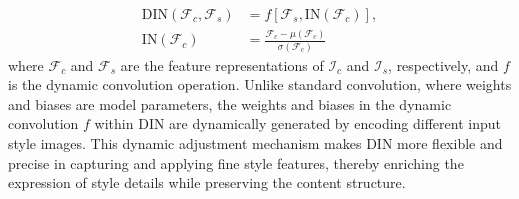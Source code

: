 \documentclass[preprint,12pt]{elsarticle}
\begin{document}
\begin{equation}
    \begin{aligned}
        \text{DIN}(\mathcal{F}_c,\mathcal{F}_s) &= f[\mathcal{F}_s,\text{IN}(\mathcal{F}_c)],\\
        \text{IN}(\mathcal{F}_c) &= \frac{\mathcal{F}_c-\mu(\mathcal{F}_c)}{\sigma(\mathcal{F}_c)}
    \end{aligned}
\end{equation}
where $\mathcal{F}_c$ and $\mathcal{F}_s$ are the feature representations of $\mathcal{I}_c$ and $\mathcal{I}_s$, respectively, and $f$ is the dynamic convolution operation\citep{42jia2016dynamic}. Unlike standard convolution, where weights and biases are model parameters, the weights and biases in the dynamic convolution $f$ within DIN are dynamically generated by encoding different input style images. This dynamic adjustment mechanism makes DIN more flexible and precise in capturing and applying fine style features, thereby enriching the expression of style details while preserving the content structure.
\end{document}
